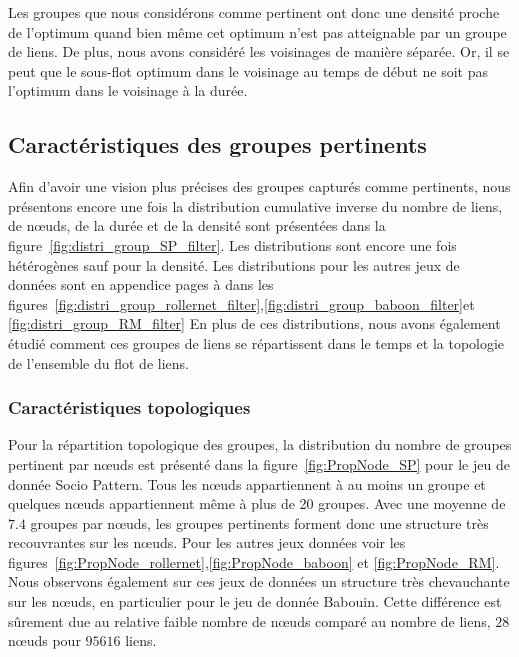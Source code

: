 Les groupes que nous considérons comme pertinent ont donc une densité proche de l'optimum quand bien même cet optimum n'est pas atteignable par un groupe de liens.
De plus, nous avons considéré les voisinages de manière séparée.
Or, il se peut que le sous-flot optimum dans le voisinage au temps de début ne soit pas l'optimum dans le voisinage à la durée.


\subsection{Caractéristiques des groupes pertinents}

Afin d'avoir une vision plus précises des groupes capturés comme pertinents, nous présentons encore une fois la distribution cumulative inverse du nombre de liens, de n\oe uds, de la durée et de la densité sont présentées dans la figure~\ref{fig:distri_group_SP_filter}.
Les distributions sont encore une fois hétérogènes sauf pour la densité.
Les distributions pour les autres jeux de données sont en appendice pages \pageref{fig:distri_group_rollernet_filter} à \pageref{fig:distri_group_RM_filter} dans les figures~\ref{fig:distri_group_rollernet_filter},\ref{fig:distri_group_baboon_filter}et \ref{fig:distri_group_RM_filter}
En plus de ces distributions, nous avons également étudié comment ces groupes de liens se répartissent dans le temps et la topologie de l'ensemble du flot de liens.

\subsubsection{Caractéristiques topologiques}
Pour la répartition topologique des groupes, la distribution du nombre de groupes pertinent par n\oe uds est présenté dans la figure~\ref{fig:PropNode_SP} pour le jeu de donnée Socio Pattern.
Tous les n\oe uds appartiennent à au moins un groupe et quelques n\oe uds appartiennent même à plus de 20 groupes.
Avec une moyenne de $7.4$ groupes par n\oe uds, les groupes pertinents forment donc une structure très recouvrantes sur les n\oe uds.
Pour les autres jeux données voir les figures~\ref{fig:PropNode_rollernet},\ref{fig:PropNode_baboon} et \ref{fig:PropNode_RM}.
Nous observons également sur ces jeux de données un structure très chevauchante sur les n\oe uds, en particulier pour le jeu de donnée Babouin.
Cette différence est sûrement due au relative faible nombre de n\oe uds comparé au nombre de liens, $28$ n\oe uds pour $95616$ liens.


